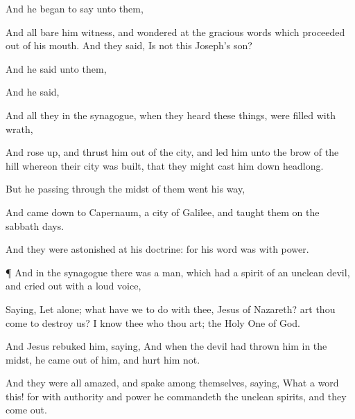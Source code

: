 {And he
began to
say
unto
them,
{}

And
all
bare
him
witness,
and
wondered
at
the
gracious
words
which
proceeded out
of
his
mouth.
And they
said,
Is
not
this
Joseph’s
son?

And he
said
unto
them,
{}

And he
said,
{}




And all
they
in the
synagogue, when they
heard these
things, were
filled with
wrath,

And rose
up, and
thrust
him out
of the
city,
and
led
him
unto the
brow of the
hill
whereon
their
city was
built,
that they might
cast
him down
headlong.

But
he
passing
through the
midst of
them went his
way,

And came
down
to
Capernaum, a
city of
Galilee,
and
taught
them
on the sabbath
days.

And they were
astonished
at
his
doctrine:
for
his
word
was
with
power.


\par }{\PP {}¶
And
in the
synagogue there
was a
man, which
had a
spirit of an
unclean
devil,
and cried
out with a
loud
voice,

Saying,
Let
{}
alone;
what have we to
do with
thee,
{}
Jesus of
Nazareth? art thou
come to
destroy
us? I
know
thee
who thou
art; the Holy
One of
God.

And
Jesus
rebuked
him,
saying,
{} And
when the
devil had
thrown
him
in the
midst, he
came out
of
him, and
hurt
him
not.

And they
were
all
amazed,
and
spake
among
themselves,
saying,
What a
word
{}
this!
for
with
authority
and
power he
commandeth the
unclean
spirits,
and they come
out.

}
